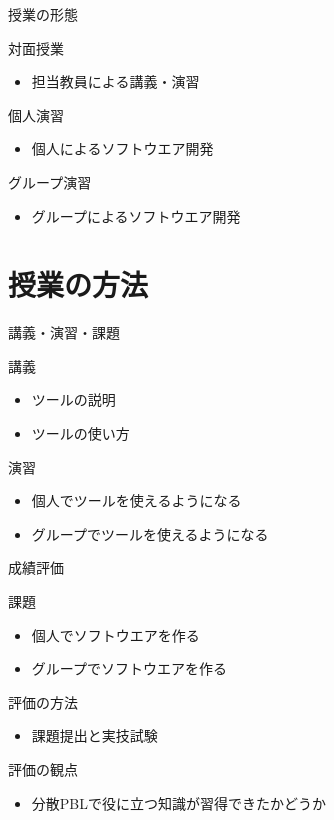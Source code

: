 \documentclass[t, aspectratio=169]{beamer}
\begin{document}
\begin{frame}[label=sec-1-2-3]{授業の形態}
\begin{block}{対面授業}
\begin{itemize}
\item 担当教員による講義・演習
\end{itemize}
\end{block}
\begin{block}{個人演習}
\begin{itemize}
\item 個人によるソフトウエア開発
\end{itemize}
\end{block}
\begin{block}{グループ演習}
\begin{itemize}
\item グループによるソフトウエア開発
\end{itemize}
\end{block}
\end{frame}
\section{授業の方法}
\label{sec-1-3}
\begin{frame}[label=sec-1-3-1]{講義・演習・課題}
\begin{block}{講義}
\begin{itemize}
\item ツールの説明
\item ツールの使い方
\end{itemize}
\end{block}
\begin{block}{演習}
\begin{itemize}
\item 個人でツールを使えるようになる
\item グループでツールを使えるようになる
\end{itemize}
\end{block}
\end{frame}
\begin{frame}[label=sec-1-3-2]{成績評価}
\begin{block}{課題}
\begin{itemize}
\item 個人でソフトウエアを作る
\item グループでソフトウエアを作る
\end{itemize}
\end{block}
\begin{block}{評価の方法}
\begin{itemize}
\item 課題提出と実技試験
\end{itemize}
\end{block}
\begin{block}{評価の観点}
\begin{itemize}
\item 分散PBLで役に立つ知識が習得できたかどうか
\end{itemize}
\end{block}
\end{frame}
\end{document}

